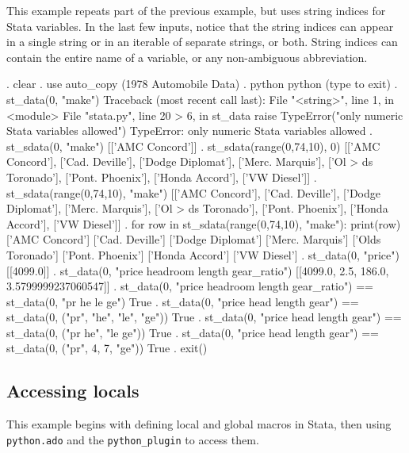 \documentclass{article}
\begin{document}
This example repeats part of the previous example, but uses string indices for Stata variables. In the last few inputs, notice that the string indices can appear in a single string or in an iterable of separate strings, or both. String indices can contain the entire name of a variable, or any non-ambiguous abbreviation.

\begin{stlog}
. clear
{\smallskip}
. use auto_copy
(1978 Automobile Data)
{\smallskip}
. python
 python (type {} to exit) 
. st_data(0, "make")
{\color{red}Traceback (most recent call last):
  File "<string>", line 1, in <module>
  File "stata.py", line 20
> 6, in st_data
    raise TypeError("only numeric Stata variables allowed")
TypeError: only numeric Stata variables allowed}
{\smallskip}
. st_sdata(0, "make")
[['AMC Concord']]
{\smallskip}
. st_sdata(range(0,74,10), 0)
[['AMC Concord'], ['Cad. Deville'], ['Dodge Diplomat'], ['Merc. Marquis'], ['Ol
> ds Toronado'], ['Pont. Phoenix'], ['Honda Accord'], ['VW Diesel']]
{\smallskip}
. st_sdata(range(0,74,10), "make")
[['AMC Concord'], ['Cad. Deville'], ['Dodge Diplomat'], ['Merc. Marquis'], ['Ol
> ds Toronado'], ['Pont. Phoenix'], ['Honda Accord'], ['VW Diesel']]
{\smallskip}
. for row in st_sdata(range(0,74,10), "make"): print(row)
['AMC Concord']
['Cad. Deville']
['Dodge Diplomat']
['Merc. Marquis']
['Olds Toronado']
['Pont. Phoenix']
['Honda Accord']
['VW Diesel']
{\smallskip}
. st_data(0, "price")
[[4099.0]]
{\smallskip}
. st_data(0, "price headroom length gear_ratio")
[[4099.0, 2.5, 186.0, 3.5799999237060547]]
{\smallskip}
. st_data(0, "price headroom length gear_ratio") == st_data(0, "pr he le ge")
True
{\smallskip}
. st_data(0, "price head length gear") == st_data(0, ("pr", "he", "le", "ge"))
True
{\smallskip}
. st_data(0, "price head length gear") == st_data(0, ("pr he", "le ge"))
True
{\smallskip}
. st_data(0, "price head length gear") == st_data(0, ("pr", 4, 7, "ge"))
True
{\smallskip}
. exit()
\end{stlog}

\smallskip


\subsection{Accessing locals} \label{local_example}

This example begins with defining local and global macros in Stata, then using \lstinline$python.ado$ and the \lstinline$python_plugin$ to access them.
\end{document}
